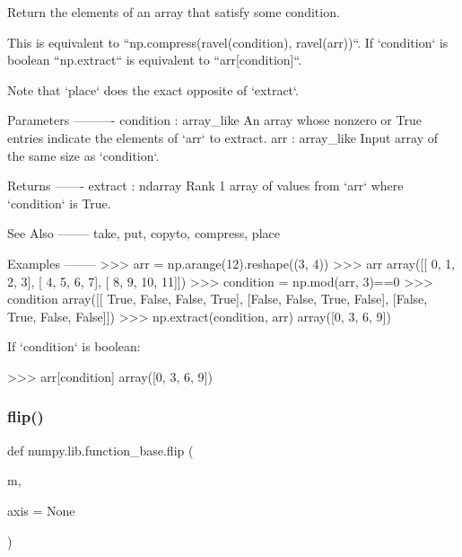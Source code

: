 \begin{DoxyVerb}Return the elements of an array that satisfy some condition.

This is equivalent to ``np.compress(ravel(condition), ravel(arr))``.  If
`condition` is boolean ``np.extract`` is equivalent to ``arr[condition]``.

Note that `place` does the exact opposite of `extract`.

Parameters
----------
condition : array_like
    An array whose nonzero or True entries indicate the elements of `arr`
    to extract.
arr : array_like
    Input array of the same size as `condition`.

Returns
-------
extract : ndarray
    Rank 1 array of values from `arr` where `condition` is True.

See Also
--------
take, put, copyto, compress, place

Examples
--------
>>> arr = np.arange(12).reshape((3, 4))
>>> arr
array([[ 0,  1,  2,  3],
       [ 4,  5,  6,  7],
       [ 8,  9, 10, 11]])
>>> condition = np.mod(arr, 3)==0
>>> condition
array([[ True, False, False,  True],
       [False, False,  True, False],
       [False,  True, False, False]])
>>> np.extract(condition, arr)
array([0, 3, 6, 9])


If `condition` is boolean:

>>> arr[condition]
array([0, 3, 6, 9])\end{DoxyVerb}
 \mbox{\label{namespacenumpy_1_1lib_1_1function__base_ab1ffa989c13eca5fda1c75cf8494d9d2}} 
\subsubsection{\texorpdfstring{flip()}{flip()}}
{\footnotesize\ttfamily def numpy.\+lib.\+function\+\_\+base.\+flip (\begin{DoxyParamCaption}\item[{}]{m,  }\item[{}]{axis = {\ttfamily None} }\end{DoxyParamCaption})}

